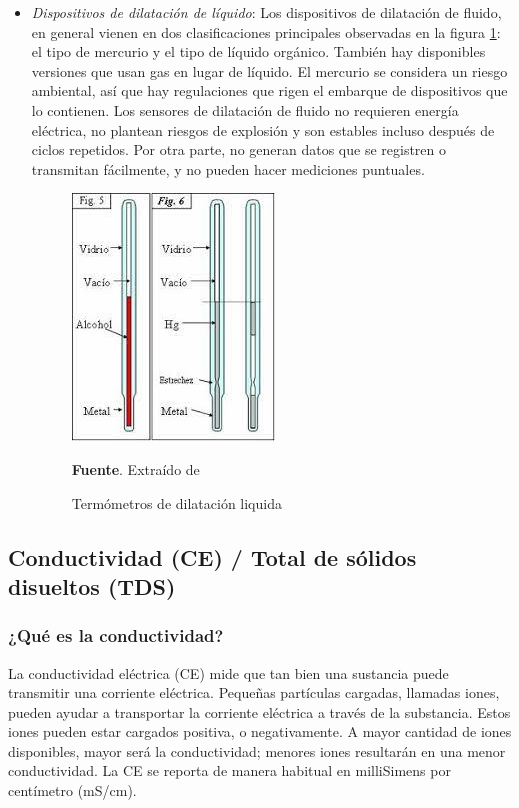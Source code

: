 \begin{itemize}
    \item \textit{Dispositivos de dilatación de l\'iquido}: Los dispositivos de dilatación de fluido, en general vienen en dos clasificaciones principales observadas en la figura \ref{fig:dilatacion_li}: el tipo de mercurio y el tipo de líquido orgánico. También hay disponibles versiones que usan gas en lugar de líquido. El mercurio se considera un riesgo ambiental, así que hay regulaciones que rigen el embarque de dispositivos que lo contienen. Los sensores de dilatación de fluido no requieren energía eléctrica, no plantean riesgos de explosión y son estables incluso después de ciclos repetidos. Por otra parte, no generan datos que se registren o transmitan fácilmente, y no pueden hacer mediciones puntuales.\cite{omega_engineering_inc_medicion_nodate}
    \begin{figure}[ht]
        \centering
        \label{fig:dilatacion_li}
        \includegraphics[scale=0.6]{Imagenes/cap2/Dilatacion Liquida.jpg}\\
        \bigskip
        \caption { Term\'ometros de dilataci\'on liquida  } \textbf{Fuente}. Extra\'ido de \cite{equipos_y_laboratorio_de_colombia_termometros_nodate}
    \end{figure}

\end{itemize}
    

\subsection{Conductividad (CE) / Total de sólidos disueltos (TDS)}

\subsubsection{¿Qué es la conductividad?}
La conductividad eléctrica (CE) mide que tan bien una sustancia puede transmitir una corriente eléctrica. 
Pequeñas partículas cargadas, llamadas iones, pueden ayudar a transportar la corriente eléctrica a través de la substancia. 
Estos iones pueden estar cargados positiva, o negativamente. A mayor cantidad de iones disponibles, mayor será la conductividad; menores iones resultarán en una menor conductividad. 
La CE se reporta de manera habitual en milliSimens por centímetro (mS/cm).

